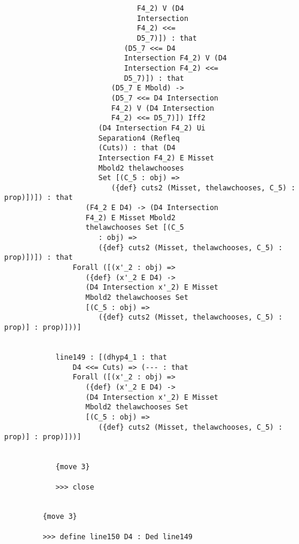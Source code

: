 \documentclass[12pt]{article}
\begin{document}
\begin{verbatim}
                               F4_2) V (D4 
                               Intersection 
                               F4_2) <<= 
                               D5_7)]) : that 
                            (D5_7 <<= D4 
                            Intersection F4_2) V (D4 
                            Intersection F4_2) <<= 
                            D5_7)]) : that 
                         (D5_7 E Mbold) -> 
                         (D5_7 <<= D4 Intersection 
                         F4_2) V (D4 Intersection 
                         F4_2) <<= D5_7)]) Iff2 
                      (D4 Intersection F4_2) Ui 
                      Separation4 (Refleq 
                      (Cuts)) : that (D4 
                      Intersection F4_2) E Misset 
                      Mbold2 thelawchooses 
                      Set [(C_5 : obj) => 
                         ({def} cuts2 (Misset, thelawchooses, C_5) : prop)])]) : that 
                   (F4_2 E D4) -> (D4 Intersection 
                   F4_2) E Misset Mbold2 
                   thelawchooses Set [(C_5 
                      : obj) => 
                      ({def} cuts2 (Misset, thelawchooses, C_5) : prop)])]) : that 
                Forall ([(x'_2 : obj) => 
                   ({def} (x'_2 E D4) -> 
                   (D4 Intersection x'_2) E Misset 
                   Mbold2 thelawchooses Set 
                   [(C_5 : obj) => 
                      ({def} cuts2 (Misset, thelawchooses, C_5) : prop)] : prop)]))]


            line149 : [(dhyp4_1 : that 
                D4 <<= Cuts) => (--- : that 
                Forall ([(x'_2 : obj) => 
                   ({def} (x'_2 E D4) -> 
                   (D4 Intersection x'_2) E Misset 
                   Mbold2 thelawchooses Set 
                   [(C_5 : obj) => 
                      ({def} cuts2 (Misset, thelawchooses, C_5) : prop)] : prop)]))]


            {move 3}

            >>> close


         {move 3}

         >>> define line150 D4 : Ded line149



\end{verbatim}
\end{document}
